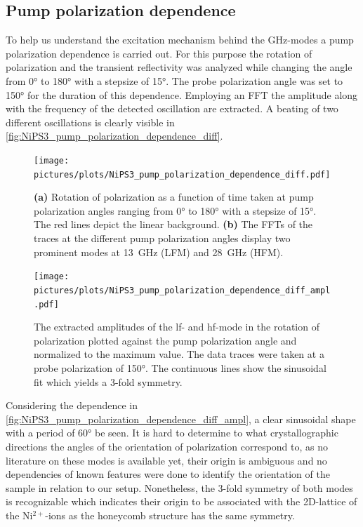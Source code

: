 \subsection{Pump polarization dependence}
To help us understand the excitation mechanism behind the GHz-modes a pump polarization dependence is carried out.
For this purpose the rotation of polarization and the transient reflectivity was analyzed while changing the angle from 0° to 180° with a stepsize of 15°.
The probe polarization angle was set to 150° for the duration of this dependence.
Employing an FFT the amplitude along with the frequency of the detected oscillation are extracted.
A beating of two different oscillations is clearly visible in \autoref{fig:NiPS3_pump_polarization_dependence_diff}.
\begin{figure}[hbt!]
    \centering
    \texttt{[image: pictures/plots/NiPS3\_pump\_polarization\_dependence\_diff.pdf]} \vspace{-0.3cm}
    \caption{\textbf{(a)} Rotation of polarization as a function of time taken at pump polarization angles ranging from 0° to 180° with a stepsize of 15°. The red lines depict the linear background. \textbf{(b)} The FFTs of the traces at the different pump polarization angles display two prominent modes at \qty{13}{GHz} (LFM) and \qty{28}{GHz} (HFM).}
    \label{fig:NiPS3_pump_polarization_dependence_diff}
\end{figure}
\FloatBarrier
\begin{figure}[hbt!]
    \centering  
    \texttt{[image: pictures/plots/NiPS3\_pump\_polarization\_dependence\_diff\_ampl.pdf]} \vspace{-0.3cm}
    \caption{The extracted amplitudes of the lf- and hf-mode in the rotation of polarization plotted against the pump polarization angle and normalized to the maximum value. The data traces were taken at a probe polarization of 150°. The continuous lines show the sinusoidal fit which yields a 3-fold symmetry.}
    \label{fig:NiPS3_pump_polarization_dependence_diff_ampl}
\end{figure}
\FloatBarrier
Considering the dependence in \autoref{fig:NiPS3_pump_polarization_dependence_diff_ampl}, a clear sinusoidal shape with a period of 60° be seen.
It is hard to determine to what crystallographic directions the angles of the orientation of polarization correspond to, as no literature on these modes is available yet, their origin is ambiguous and no dependencies of known features were done to identify the orientation of the sample in relation to our setup.
Nonetheless, the 3-fold symmetry of both modes is recognizable which indicates their origin to be associated with the 2D-lattice of the Ni$^{2+}$-ions as the honeycomb structure has the same symmetry.

